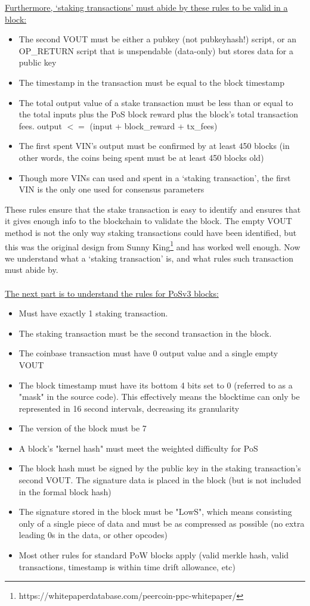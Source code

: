 \underline{Furthermore, ‘staking transactions’ must abide by these rules to be valid
in a block:}
\begin{itemize}
	\item The second VOUT must be either a pubkey (not pubkeyhash!) script,
	or an OP\_RETURN script that is unspendable (data-only) but stores data
	for a public key
	\item The timestamp in the transaction must be equal to the block timestamp
	\item The total output value of a stake transaction must be less than or
	equal to the total inputs plus the PoS block reward plus the block's
	total transaction fees. output $<=$ (input + block\_reward + tx\_fees)
	\item The first spent VIN's output must be confirmed by at least 450
	blocks (in other words, the coins being spent must be at least 450
	blocks old)
	\item Though more VINs can used and spent in a ‘staking transaction’,
	the first VIN is the only one used for consensus parameters
\end{itemize}
\newpage
\noindent
These rules ensure that the stake transaction is easy to identify and
ensures that it gives enough info to the blockchain to validate the block.
The empty VOUT method is not the only way staking transactions could have
been identified, but this was the original design from Sunny
King\footnote{https://whitepaperdatabase.com/peercoin-ppc-whitepaper/}
and has worked well enough. Now we understand what a ‘staking transaction’
is, and what rules such transaction must abide by.
\\
\\
\noindent
\underline{The next part is to understand the rules for PoSv3 blocks:}
\begin{itemize}
	\item Must have exactly 1 staking transaction.
	\item The staking transaction must be the second transaction in the block.
	\item The coinbase transaction must have 0 output value and a single empty VOUT
	\item The block timestamp must have its bottom 4 bits set to 0 (referred
	to as a "mask" in the source code). This effectively means the blocktime
	can only be represented in 16 second intervals, decreasing its granularity
	\item The version of the block must be 7
	\item A block's "kernel hash" must meet the weighted difficulty for PoS
	\item The block hash must be signed by the public key in the staking
	transaction's second VOUT. The signature data is placed in the block
	(but is not included in the formal block hash)
	\item The signature stored in the block must be "LowS", which means
	consisting only of a single piece of data and must be as compressed
	as possible (no extra leading 0s in the data, or other opcodes)
	\item Most other rules for standard PoW blocks apply (valid merkle
	hash, valid transactions, timestamp is within time drift allowance, etc)
\end{itemize}



